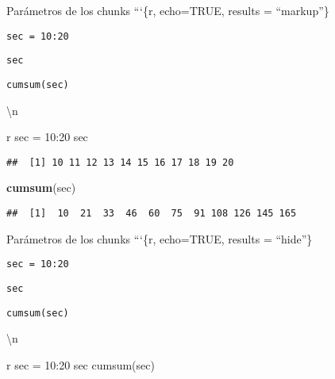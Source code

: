 \documentclass[
  ignorenonframetext,
]{beamer}
\newenvironment{Shaded}{\begin{snugshade}}{\end{snugshade}}
\newcommand{\FunctionTok}[1]{\textcolor[rgb]{0.13,0.29,0.53}{\textbf{#1}}}
\newcommand{\NormalTok}[1]{#1}
\begin{document}
\begin{frame}[fragile]{Parámetros de los chunks}
\label{paruxe1metros-de-los-chunks-2}
```\{r, echo=TRUE, results = ``markup''\}

\texttt{sec\ =\ 10:20}

\texttt{sec}

\texttt{cumsum(sec)}

\begin{Shaded}
\begin{Highlighting}[]

\NormalTok{\textbackslash{}n}


\NormalTok{\textasciigrave{}\textasciigrave{}\textasciigrave{} r}
\NormalTok{sec = 10:20}
\NormalTok{sec}
\end{Highlighting}
\end{Shaded}

\begin{verbatim}
##  [1] 10 11 12 13 14 15 16 17 18 19 20
\end{verbatim}

\begin{Shaded}
\begin{Highlighting}[]
\FunctionTok{cumsum}\NormalTok{(sec)}
\end{Highlighting}
\end{Shaded}

\begin{verbatim}
##  [1]  10  21  33  46  60  75  91 108 126 145 165
\end{verbatim}
\end{frame}

\begin{frame}[fragile]{Parámetros de los chunks}
\label{paruxe1metros-de-los-chunks-3}
```\{r, echo=TRUE, results = ``hide''\}

\texttt{sec\ =\ 10:20}

\texttt{sec}

\texttt{cumsum(sec)}

\begin{Shaded}
\begin{Highlighting}[]

\NormalTok{\textbackslash{}n}


\NormalTok{\textasciigrave{}\textasciigrave{}\textasciigrave{} r}
\NormalTok{sec = 10:20}
\NormalTok{sec}
\NormalTok{cumsum(sec)}
\end{Highlighting}
\end{Shaded}
\end{frame}
\end{document}
